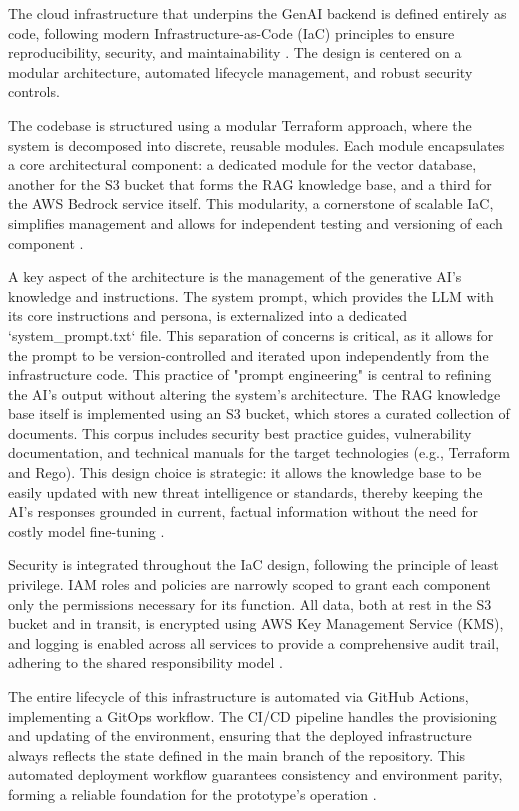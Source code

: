 The cloud infrastructure that underpins the GenAI backend is defined entirely as code, following modern Infrastructure-as-Code (IaC) principles to ensure reproducibility, security, and maintainability \cite{dasari_infrastructure_2025}. The design is centered on a modular architecture, automated lifecycle management, and robust security controls.

The codebase is structured using a modular Terraform approach, where the system is decomposed into discrete, reusable modules. Each module encapsulates a core architectural component: a dedicated module for the vector database, another for the S3 bucket that forms the RAG knowledge base, and a third for the AWS Bedrock service itself. This modularity, a cornerstone of scalable IaC, simplifies management and allows for independent testing and versioning of each component \cite{howard_terraform_2022}.

A key aspect of the architecture is the management of the generative AI's knowledge and instructions. The system prompt, which provides the LLM with its core instructions and persona, is externalized into a dedicated `system\_prompt.txt` file. This separation of concerns is critical, as it allows for the prompt to be version-controlled and iterated upon independently from the infrastructure code. This practice of "prompt engineering" is central to refining the AI's output without altering the system's architecture. The RAG knowledge base itself is implemented using an S3 bucket, which stores a curated collection of documents. This corpus includes security best practice guides, vulnerability documentation, and technical manuals for the target technologies (e.g., Terraform and Rego). This design choice is strategic: it allows the knowledge base to be easily updated with new threat intelligence or standards, thereby keeping the AI's responses grounded in current, factual information without the need for costly model fine-tuning \cite{lewis_retrieval-augmented_2021}.

Security is integrated throughout the IaC design, following the principle of least privilege. IAM roles and policies are narrowly scoped to grant each component only the permissions necessary for its function. All data, both at rest in the S3 bucket and in transit, is encrypted using AWS Key Management Service (KMS), and logging is enabled across all services to provide a comprehensive audit trail, adhering to the shared responsibility model \cite{noauthor_aws_nodate}.

The entire lifecycle of this infrastructure is automated via GitHub Actions, implementing a GitOps workflow. The CI/CD pipeline handles the provisioning and updating of the environment, ensuring that the deployed infrastructure always reflects the state defined in the main branch of the repository. This automated deployment workflow guarantees consistency and environment parity, forming a reliable foundation for the prototype's operation \cite{noauthor_gitops_nodate}.

